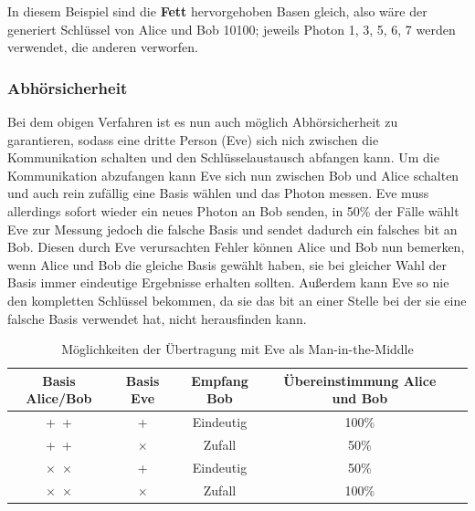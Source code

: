 \begin{table}[!htb]
    \label{table:alice-bob-uebertragung}
\end{table}
    
In diesem Beispiel sind die \textbf{Fett} hervorgehoben Basen gleich, also wäre der generiert Schlüssel von Alice und Bob 10100; jeweils Photon 1, 3, 5, 6, 7 werden verwendet, die anderen verworfen.

\subsubsection{Abhörsicherheit}

Bei dem obigen Verfahren ist es nun auch möglich Abhörsicherheit zu garantieren, sodass eine dritte Person (Eve) sich nich zwischen die Kommunikation schalten und den Schlüsselaustausch abfangen kann.
Um die Kommunikation abzufangen kann Eve sich nun zwischen Bob und Alice schalten und auch rein zufällig eine Basis wählen und das Photon messen.
Eve muss allerdings sofort wieder ein neues Photon an Bob senden, in 50\% der Fälle wählt Eve zur Messung jedoch die falsche Basis und sendet dadurch ein falsches bit an Bob.
Diesen durch Eve verursachten Fehler können Alice und Bob nun bemerken, wenn Alice und Bob die gleiche Basis gewählt haben, sie bei gleicher Wahl der Basis immer eindeutige Ergebnisse erhalten sollten.
Außerdem kann Eve so nie den kompletten Schlüssel bekommen, da sie das bit an einer Stelle bei der sie eine falsche Basis verwendet hat, nicht herausfinden kann.

\begin{table}[ht]
    \centering
    \begin{tabular}{|c|c|c|c|c|}
    \hline
    Basis Alice/Bob     & Basis Eve & Empfang Bob   & Übereinstimmung Alice und Bob \\ \hline
    +~+                 & +         & Eindeutig     & 100\% \\ \hline
    +~+                 & $\times$  & Zufall        & 50\%  \\ \hline 
    $\times$~$\times$   & +         & Eindeutig     & 50\%  \\ \hline
    $\times$~$\times$   & $\times$  & Zufall        & 100\% \\ \hline
    
    \end{tabular}
    \caption{Möglichkeiten der Übertragung mit Eve als Man-in-the-Middle \cite{quantenschluesselaustausch}}
    \label{table:eve-moeglichkeiten}
\end{table}

